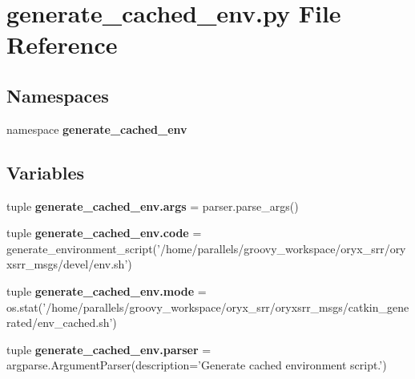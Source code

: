 \section{generate\-\_\-cached\-\_\-env.\-py \-File \-Reference}
\label{generate__cached__env_8py}
\subsection*{\-Namespaces}
\begin{DoxyCompactItemize}
\item 
namespace {\bf generate\-\_\-cached\-\_\-env}
\end{DoxyCompactItemize}
\subsection*{\-Variables}
\begin{DoxyCompactItemize}
\item 
tuple {\bf generate\-\_\-cached\-\_\-env.\-args} = parser.\-parse\-\_\-args()
\item 
tuple {\bf generate\-\_\-cached\-\_\-env.\-code} = generate\-\_\-environment\-\_\-script('/home/parallels/groovy\-\_\-workspace/oryx\-\_\-srr/oryxsrr\-\_\-msgs/devel/env.\-sh')
\item 
tuple {\bf generate\-\_\-cached\-\_\-env.\-mode} = os.\-stat('/home/parallels/groovy\-\_\-workspace/oryx\-\_\-srr/oryxsrr\-\_\-msgs/catkin\-\_\-generated/env\-\_\-cached.\-sh')
\item 
tuple {\bf generate\-\_\-cached\-\_\-env.\-parser} = argparse.\-Argument\-Parser(description='\-Generate cached environment script.')
\end{DoxyCompactItemize}
